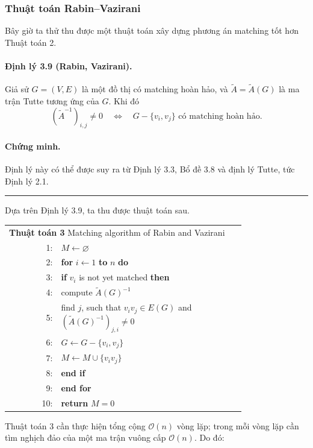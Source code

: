 \documentclass[11pt]{article}
\newcommand{\Oh}{\mathcal{O}}
\newcommand{\qedmark}{\hfill\rule{0.7ex}{0.7ex}}
\begin{document}
\subsubsection{Thuật toán Rabin--Vazirani}

Bây giờ ta thử thu được một thuật toán xây dựng phương án matching tốt hơn
Thuật toán 2.

\paragraph{Định lý 3.9 (Rabin, Vazirani).}
Giả sử \(G=(V,E)\) là một đồ thị có matching hoàn hảo, và
\(\tilde A=\tilde A(G)\) là ma trận Tutte tương ứng của \(G\). Khi đó
\[
  (\tilde A^{-1})_{i,j}\ne 0
  \quad\Longleftrightarrow\quad
  G-\{v_i,v_j\}\text{ có matching hoàn hảo.}
\]

\paragraph{Chứng minh.}
Định lý này có thể được suy ra từ Định lý 3.3, Bổ đề 3.8 và định lý Tutte,
tức Định lý 2.1. \qedmark

Dựa trên Định lý 3.9, ta thu được thuật toán sau.

\begin{center}
\small
\begin{tabular}{r@{\quad}p{0.78\linewidth}}
\multicolumn{2}{l}{\textbf{Thuật toán 3} Matching algorithm of Rabin and Vazirani}\\
1: & \(M\gets\varnothing\)\\
2: & \textbf{for} \(i\gets 1\) \textbf{to} \(n\) \textbf{do}\\
3: & \quad \textbf{if} \(v_i\) is not yet matched \textbf{then}\\
4: & \qquad compute \(\tilde A(G)^{-1}\)\\
5: & \qquad find \(j\), such that \(v_iv_j\in E(G)\) and
      \((\tilde A(G)^{-1})_{j,i}\ne 0\)\\
6: & \qquad \(G\gets G-\{v_i,v_j\}\)\\
7: & \qquad \(M\gets M\cup\{v_iv_j\}\)\\
8: & \quad \textbf{end if}\\
9: & \textbf{end for}\\
10: & \textbf{return} \(M=0\)
\end{tabular}
\end{center}

Thuật toán 3 cần thực hiện tổng cộng \(\Oh(n)\) vòng lặp; trong mỗi vòng lặp
cần tìm nghịch đảo của một ma trận vuông cấp \(\Oh(n)\). Do đó:
\end{document}
